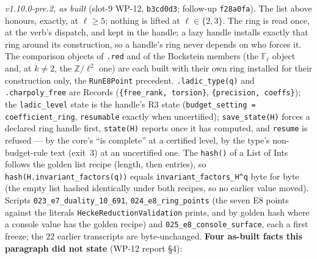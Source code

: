 \documentclass[11pt]{article}
\theoremstyle{remark}
\newcommand{\F}{\mathbb{F}}
\newcommand{\Z}{\mathbb{Z}}
\newcommand{\Fl}{\F_\ell}
\begin{document}
\emph{v1.10.0-pre.2, as built} (slot-9 WP-12, \texttt{b3cd0d3}; follow-up \texttt{f28a0fa}).
The list above honours, exactly, at $\ell\ge5$; nothing is lifted at $\ell\in\{2,3\}$. The ring is
read once, at the verb's dispatch, and kept in the handle; a lazy handle installs exactly that ring
around its construction, so a handle's ring never depends on who forces it. The comparison
objects of \texttt{.red} and of the Bockstein members (the $\Fl$ object and, at $k\ne2$, the
$\Z/\ell^2$ one) are each built with their own ring installed for their construction only, the
\texttt{RunE8Point} precedent. \texttt{.ladic\_type(q)} and \texttt{.charpoly\_free} are Records
(\texttt{\{free\_rank, torsion\}}, \texttt{\{precision, coeffs\}}); the \texttt{ladic\_level} state is
the handle's R3 state (\texttt{budget\_setting = coefficient\_ring}, \texttt{resumable} exactly
when uncertified); \texttt{save\_state(H)} forces a declared ring handle first, \texttt{state(H)}
reports once it has computed, and \texttt{resume} is refused --- by the core's ``is complete'' at
a certified level, by the type's non-budget-rule text (exit~$3$) at an uncertified one. The
\texttt{hash()} of a List of Ints follows the golden list recipe (length, then entries), so
\texttt{hash(H.invariant\_factors(q))} equals \texttt{invariant\_factors\_H\textasciicircum q}
byte for byte (the empty list hashed identically under both recipes, so no earlier value moved).
Scripts \texttt{023\_e7\_duality\_10\_691}, \texttt{024\_e8\_ring\_points} (the seven E8 points
against the literals \texttt{HeckeReductionValidation} prints, and by golden hash where a console
value has the golden recipe) and \texttt{025\_e8\_console\_surface}, each a first freeze; the
$22$ earlier transcripts are byte-unchanged. \textbf{Four as-built facts this paragraph did not
state} (WP-12 report \S4):
\end{document}
